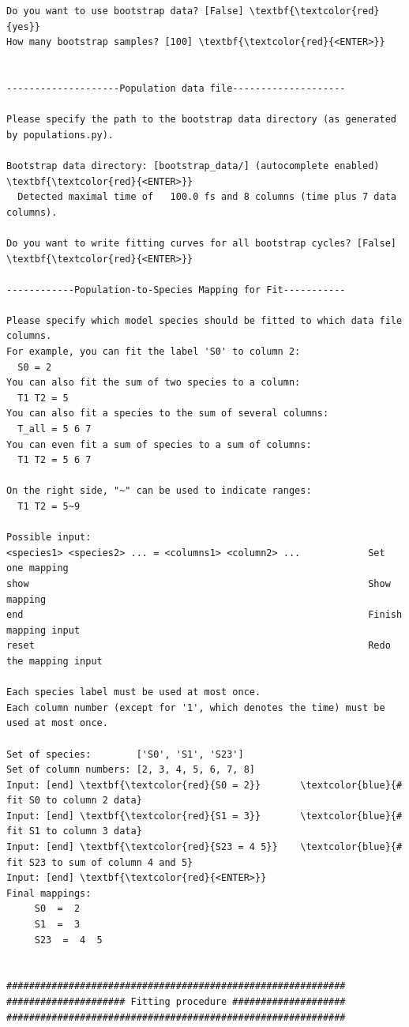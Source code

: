 \documentclass[a4paper,11pt,DIV=15,openany]{scrbook}
\begin{document}
\begin{oframed}
\begin{Verbatim}[commandchars=\\\{\}]
Do you want to use bootstrap data? [False] \textbf{\textcolor{red}{yes}}
How many bootstrap samples? [100] \textbf{\textcolor{red}{<ENTER>}}


--------------------Population data file--------------------

Please specify the path to the bootstrap data directory (as generated by populations.py).

Bootstrap data directory: [bootstrap_data/] (autocomplete enabled) \textbf{\textcolor{red}{<ENTER>}}
  Detected maximal time of   100.0 fs and 8 columns (time plus 7 data columns).

Do you want to write fitting curves for all bootstrap cycles? [False] \textbf{\textcolor{red}{<ENTER>}}

------------Population-to-Species Mapping for Fit-----------

Please specify which model species should be fitted to which data file columns.
For example, you can fit the label 'S0' to column 2:
  S0 = 2
You can also fit the sum of two species to a column:
  T1 T2 = 5
You can also fit a species to the sum of several columns:
  T_all = 5 6 7
You can even fit a sum of species to a sum of columns:
  T1 T2 = 5 6 7

On the right side, "~" can be used to indicate ranges:
  T1 T2 = 5~9

Possible input:
<species1> <species2> ... = <columns1> <column2> ...            Set one mapping
show                                                            Show mapping
end                                                             Finish mapping input
reset                                                           Redo the mapping input

Each species label must be used at most once.
Each column number (except for '1', which denotes the time) must be used at most once.

Set of species:        ['S0', 'S1', 'S23']
Set of column numbers: [2, 3, 4, 5, 6, 7, 8]
Input: [end] \textbf{\textcolor{red}{S0 = 2}}       \textcolor{blue}{# fit S0 to column 2 data}
Input: [end] \textbf{\textcolor{red}{S1 = 3}}       \textcolor{blue}{# fit S1 to column 3 data}
Input: [end] \textbf{\textcolor{red}{S23 = 4 5}}    \textcolor{blue}{# fit S23 to sum of column 4 and 5}
Input: [end] \textbf{\textcolor{red}{<ENTER>}}
Final mappings:
     S0  =  2 
     S1  =  3 
     S23  =  4  5 


############################################################
##################### Fitting procedure ####################
############################################################



\end{Verbatim}
\end{oframed}
\end{document}
